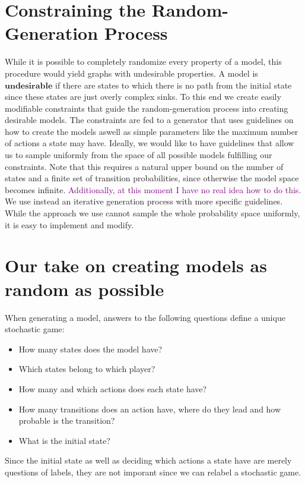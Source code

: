 \section{Constraining the Random-Generation Process}
While it is possible to completely randomize every property of a model, this procedure would yield graphs with undesirable properties. A model is $\mathbf{undesirable}$ if there are states to which there is no path from the initial state since these states are just overly complex sinks. To this end we create easily modifiable constraints that guide the random-generation process into creating desirable models. The constraints are fed to a generator that uses guidelines on how to create the models aswell as simple parameters like the maximum number of actions a state may have.
Ideally, we would like to have guidelines that allow us to sample uniformly from the space of all possible models fulfilling our constraints. Note that this requires a natural upper bound on the number of states and a finite set of transition probabilities, since otherwise the model space becomes infinite. \textcolor{purple}{Additionally, at this moment I have no real idea how to do this.}
We use instead an iterative generation process with more specific guidelines. While the approach we use cannot sample the whole probability space uniformly, it is easy to implement and modify.

\section{Our take on creating models as random as possible}
When generating a model, answers to the following questions define a unique stochastic game:
\begin{itemize}
    \item How many states does the model have?
    \item Which states belong to which player?
    \item How many and which actions does each state have?
    \item How many transitions does an action have, where do they lead and how probable is the transition?
    \item What is the initial state?
\end{itemize}

Since the initial state as well as deciding which actions a state have are merely questions of labels, they are not imporant since we can relabel a stochastic game.


